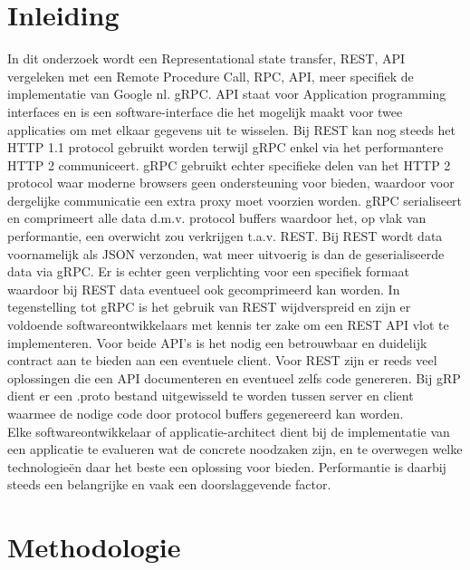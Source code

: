 \documentclass[a0,portrait]{hogent-poster}
\begin{document}
\begin{multicols}{2} %

\section{Inleiding}

In dit onderzoek wordt een Representational state transfer, REST, API vergeleken met een Remote Procedure Call, RPC, API, meer specifiek de
implementatie van Google nl. gRPC.
API staat voor Application programming interfaces en is een software-interface die het mogelijk maakt voor twee applicaties om met elkaar gegevens uit te wisselen.
Bij REST kan nog steeds het HTTP 1.1 protocol gebruikt worden terwijl gRPC enkel via het performantere HTTP 2 communiceert.
gRPC gebruikt echter specifieke delen van het HTTP 2 protocol waar moderne browsers geen ondersteuning voor bieden,
waardoor voor dergelijke communicatie een extra proxy moet voorzien worden.
gRPC serialiseert en comprimeert alle data d.m.v. protocol buffers waardoor het, op vlak van performantie, een overwicht zou verkrijgen t.a.v. REST.
Bij REST wordt data voornamelijk als JSON verzonden, wat meer uitvoerig is dan de geserialiseerde data via gRPC.
Er is echter geen verplichting voor een specifiek formaat waardoor bij REST data eventueel ook gecomprimeerd kan worden.
In tegenstelling tot gRPC is het gebruik van REST wijdverspreid en zijn er voldoende softwareontwikkelaars met kennis ter zake om een REST API vlot te implementeren.
Voor beide API's is het nodig een betrouwbaar en duidelijk contract aan te bieden aan een eventuele client.
Voor REST zijn er reeds veel oplossingen die een API documenteren en eventueel zelfs code genereren.
Bij gRP dient er een .proto bestand uitgewisseld te worden tussen server en client waarmee de nodige code door protocol buffers gegenereerd kan worden.\\
Elke softwareontwikkelaar of applicatie-architect dient bij de implementatie van een applicatie te evalueren wat de concrete noodzaken
zijn, en te overwegen welke technologie\"en daar het beste een oplossing voor bieden. Performantie is daarbij
steeds een belangrijke en vaak een doorslaggevende factor.

\section{Methodologie}


\end{multicols}
\end{document}
